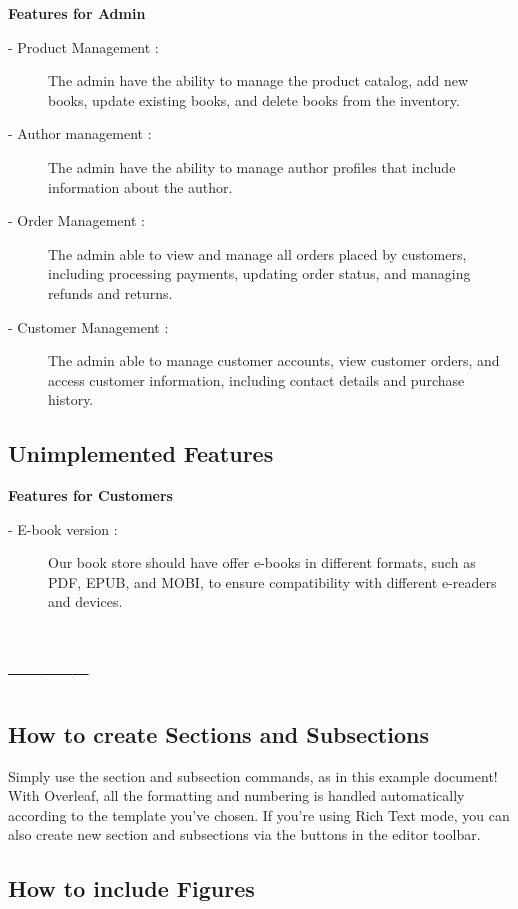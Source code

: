 \documentclass[12pt,a4paper]{article}
\begin{document}
\vspace{5mm}
{\large\textbf{Features for Admin}}
\begin{description}
    \item[- Product Management :] The admin have the ability to manage the product catalog, add new books, update existing books, and delete books from the inventory.
    \item[- Author management :] The admin have the ability to manage author profiles that include information about the author.
    \item[- Order Management :] The admin able to view and manage all orders placed by customers, including processing payments, updating order status, and managing refunds and returns.
    \item[- Customer Management :] The admin able to manage customer accounts, view customer orders, and access customer information, including contact details and purchase history.
\end{description}
\subsection{Unimplemented Features}
{\large\textbf{Features for Customers}}
\begin{description}
    \item[- E-book version :] Our book store should have offer e-books in different formats, such as PDF, EPUB, and MOBI, to ensure compatibility with different e-readers and devices.
\end{description}
\section{--------}
\subsection{How to create Sections and Subsections}

Simply use the section and subsection commands, as in this example document! With Overleaf, all the formatting and numbering is handled automatically according to the template you've chosen. If you're using Rich Text mode, you can also create new section and subsections via the buttons in the editor toolbar.

\subsection{How to include Figures}
\end{document}
